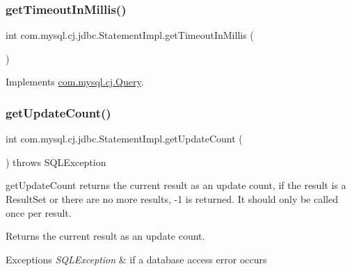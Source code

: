 \subsubsection{\texorpdfstring{get\+Timeout\+In\+Millis()}{getTimeoutInMillis()}}
{\footnotesize\ttfamily int com.\+mysql.\+cj.\+jdbc.\+Statement\+Impl.\+get\+Timeout\+In\+Millis (\begin{DoxyParamCaption}{ }\end{DoxyParamCaption})}



Implements \mbox{\hyperlink{interfacecom_1_1mysql_1_1cj_1_1_query_a54f609a5c08b91fe0008e9b3334d0d82}{com.\+mysql.\+cj.\+Query}}.

\mbox{\label{classcom_1_1mysql_1_1cj_1_1jdbc_1_1_statement_impl_abb1d31f01f22e76a4d2a03c26905cb2e}} 
\subsubsection{\texorpdfstring{get\+Update\+Count()}{getUpdateCount()}}
{\footnotesize\ttfamily int com.\+mysql.\+cj.\+jdbc.\+Statement\+Impl.\+get\+Update\+Count (\begin{DoxyParamCaption}{ }\end{DoxyParamCaption}) throws S\+Q\+L\+Exception}

get\+Update\+Count returns the current result as an update count, if the result is a Result\+Set or there are no more results, -\/1 is returned. It should only be called once per result.

\begin{DoxyReturn}{Returns}
the current result as an update count.
\end{DoxyReturn}

\begin{DoxyExceptions}{Exceptions}
{\em S\+Q\+L\+Exception} & if a database access error occurs \\
\hline
\end{DoxyExceptions}
\mbox{\label{classcom_1_1mysql_1_1cj_1_1jdbc_1_1_statement_impl_aeeda73d9ee01ed8c74d90c4014614412}} 
